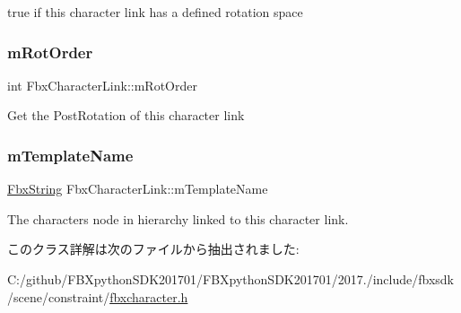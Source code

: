 {\ttfamily true} if this character link has a defined rotation space 

\mbox{\label{class_fbx_character_link_ae55332d252f95e91e842117a566f53d7}} 
\subsubsection{\texorpdfstring{m\+Rot\+Order}{mRotOrder}}
{\footnotesize\ttfamily int Fbx\+Character\+Link\+::m\+Rot\+Order}



Get the Post\+Rotation of this character link 

\mbox{\label{class_fbx_character_link_a57e20720f9a533670e5b003f9a3d05f2}} 
\subsubsection{\texorpdfstring{m\+Template\+Name}{mTemplateName}}
{\footnotesize\ttfamily \hyperlink{class_fbx_string}{Fbx\+String} Fbx\+Character\+Link\+::m\+Template\+Name}



The character\textquotesingle{}s node in hierarchy linked to this character link. 



このクラス詳解は次のファイルから抽出されました\+:\begin{DoxyCompactItemize}
\item 
C\+:/github/\+F\+B\+Xpython\+S\+D\+K201701/\+F\+B\+Xpython\+S\+D\+K201701/2017./include/fbxsdk/scene/constraint/\hyperlink{fbxcharacter_8h}{fbxcharacter.\+h}\end{DoxyCompactItemize}
